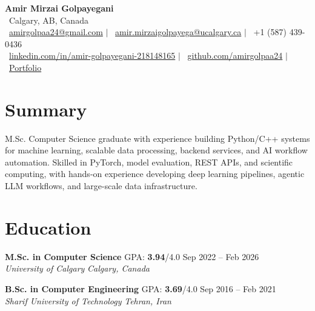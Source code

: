 \documentclass[a4paper,10pt]{article}
\newcommand{\resumeEducationSubheading}[5]{
    \textbf{#1} \hfill #2 \hfill #3 \\
    \textit{#4} \hfill \textit{#5}
}
\begin{document}

\begin{center}
    {\LARGE \textbf{Amir Mirzai Golpayegani}} \\[0.25em]
    \faMapMarker*~Calgary, AB, Canada \\[0.25em]
    \faEnvelope~\href{mailto:amirgolpaa24@gmail.com}{amirgolpaa24@gmail.com}
    $|$
    \faEnvelope~\href{mailto:amir.mirzaigolpayega@ucalgary.ca}{amir.mirzaigolpayega@ucalgary.ca}
    $|$
    \faPhone*~+1 (587) 439-0436 \\[0.25em]
    \faLinkedin~\href{https://linkedin.com/in/amir-golpayegani-218148165}{linkedin.com/in/amir-golpayegani-218148165}
    $|$
    \faGithub~\href{https://github.com/amirgolpaa24}{github.com/amirgolpaa24}
    $|$
    \faGlobe~\href{https://amir-portfolio-navy.vercel.app/}{Portfolio}
\end{center}


\section*{Summary}

M.Sc. Computer Science graduate with experience building Python/C++ systems for machine learning, scalable data processing, backend services, and AI workflow automation. Skilled in PyTorch, model evaluation, REST APIs, and scientific computing, with hands-on experience developing deep learning pipelines, agentic LLM workflows, and large-scale data infrastructure.


\section*{Education}

\resumeEducationSubheading
{M.Sc. in Computer Science}
{GPA: \textbf{3.94}/4.0}
{Sep 2022 -- Feb 2026}
{University of Calgary}
{Calgary, Canada}

\vspace{0.35em}

\resumeEducationSubheading
{B.Sc. in Computer Engineering}
{GPA: \textbf{3.69}/4.0}
{Sep 2016 -- Feb 2021}
{Sharif University of Technology}
{Tehran, Iran}

\end{document}
